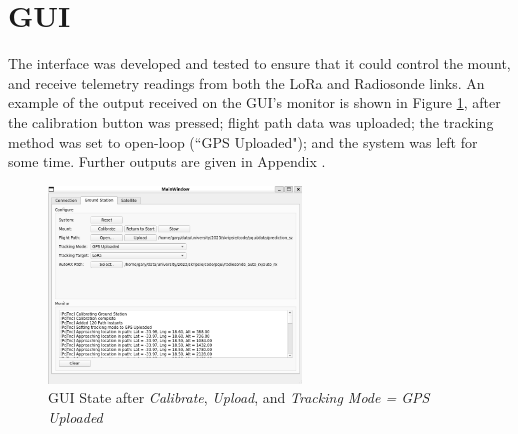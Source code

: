 \graphicspath{{./figures}}

\section{GUI}

The interface was developed and tested to ensure that it could control the mount, and receive telemetry readings from both the LoRa and Radiosonde links. An example of the output received on the GUI's monitor is shown in Figure \ref{fig:guiOpenLoop}, after the calibration button was pressed; flight path data was uploaded; the tracking method was set to open-loop (``GPS Uploaded"); and the system was left for some time. Further outputs are given in Appendix .

\begin{figure}[!htb]
  \centering
  \includegraphics[width=0.6\textwidth]{guiOpenLoop}
  \caption{GUI State after \textit{Calibrate}, \textit{Upload}, and \textit{Tracking Mode = GPS Uploaded}}
  \label{fig:guiOpenLoop}
\end{figure}